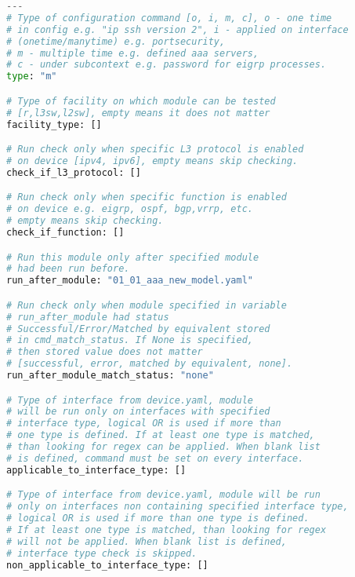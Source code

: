 
\iffalse
\begin{lstlisting}[frame=single,numbers=right,caption={Konfiguračný súbor \texttt{01\_02\_aaa\_server.yaml}, ktorý popisuje základné informácie o~jednom konkrétnom zariadení},label=yaml:module,basicstyle=\ttfamily\small,rulecolor=\color{black}, keywordstyle=\color{black},language=python,breaklines=true]
---
# Type of configuration command [o, i, m, c], o - one time 
# in config e.g. "ip ssh version 2", i - applied on interface
# (onetime/manytime) e.g. portsecurity, 
# m - multiple time e.g. defined aaa servers, 
# c - under subcontext e.g. password for eigrp processes.
type: "m"

# Type of facility on which module can be tested 
# [r,l3sw,l2sw], empty means it does not matter
facility_type: []

# Run check only when specific L3 protocol is enabled
# on device [ipv4, ipv6], empty means skip checking.
check_if_l3_protocol: []

# Run check only when specific function is enabled
# on device e.g. eigrp, ospf, bgp,vrrp, etc.
# empty means skip checking.
check_if_function: []

# Run this module only after specified module
# had been run before.
run_after_module: "01_01_aaa_new_model.yaml"

# Run check only when module specified in variable 
# run_after_module had status 
# Successful/Error/Matched by equivalent stored 
# in cmd_match_status. If None is specified, 
# then stored value does not matter 
# [successful, error, matched by equivalent, none].
run_after_module_match_status: "none" 

# Type of interface from device.yaml, module 
# will be run only on interfaces with specified 
# interface type, logical OR is used if more than
# one type is defined. If at least one type is matched,
# than looking for regex can be applied. When blank list
# is defined, command must be set on every interface.
applicable_to_interface_type: []

# Type of interface from device.yaml, module will be run
# only on interfaces non containing specified interface type,
# logical OR is used if more than one type is defined. 
# If at least one type is matched, than looking for regex
# will not be applied. When blank list is defined,
# interface type check is skipped.
non_applicable_to_interface_type: [] 


\end{lstlisting}
